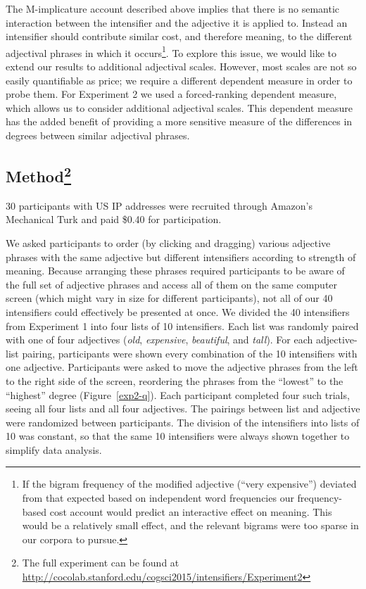 \documentclass[10pt,letterpaper]{article}
\newcommand{\w}[1]{\emph{#1}}
\begin{document}
The M-implicature account described above implies that there is no semantic interaction between the intensifier and the adjective it is applied to. Instead an intensifier should contribute similar cost, and therefore meaning, to the different adjectival phrases in which it occurs\footnote{If the bigram frequency of the modified adjective (``very expensive'') deviated from that expected based on independent word frequencies our frequency-based cost account would predict an interactive effect on meaning. This would be a relatively small effect, and the relevant bigrams were too sparse in our corpora to pursue.}.
To explore this issue, we would like to extend our results to additional adjectival scales. However, most scales are not so easily quantifiable as price; we require a different dependent measure in order to probe them.
For Experiment 2 we used a forced-ranking dependent measure, which allows us to consider additional adjectival scales. This dependent measure has the added benefit of providing a more sensitive measure of the differences in degrees between similar adjectival phrases.

\subsection{Method\footnote{The full experiment can be found at \url{http://cocolab.stanford.edu/cogsci2015/intensifiers/Experiment2}}}

30 participants with US IP addresses were recruited through Amazon's Mechanical Turk and paid \$0.40 for  participation.

We asked participants to order (by clicking and dragging) various adjective phrases with the same adjective but different intensifiers according to strength of meaning. Because arranging these phrases required participants to be aware of the full set of adjective phrases and access all of them on the same computer screen (which might vary in size for different participants), not all of our 40 intensifiers could effectively be presented at once. We divided the 40 intensifiers from Experiment 1 into four lists of 10 intensifiers. 
Each list was randomly paired with one of four adjectives (\w{old}, \w{expensive}, \w{beautiful}, and \w{tall}).
For each adjective-list pairing, participants were shown every combination of the 10 intensifiers with one adjective.
Participants were asked to move the adjective phrases from the left to the right side of the screen, reordering the phrases from the ``lowest'' to the ``highest'' degree (Figure~\ref{exp2-q}).
Each participant completed four such trials, seeing all four lists and all four adjectives.
The pairings between list and adjective were randomized between participants.
The division of the intensifiers into lists of 10 was constant, so that the same 10 intensifiers were always shown together to simplify data analysis.
\end{document}

